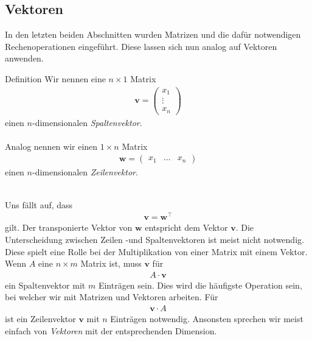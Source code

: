 \subsection{Vektoren}
In den letzten beiden Abschnitten wurden Matrizen und die dafür notwendigen Rechenoperationen eingeführt.
Diese lassen sich nun analog auf Vektoren anwenden.\\
\begin{mybox}{Definition}
Wir nennen eine $n \times 1$ Matrix
\begin{align*}
\textbf{v}
=
\begin{pmatrix}
x_1 \\
\vdots\\
x_n
\end{pmatrix}
\end{align*}
einen $n$-dimensionalen \textit{Spaltenvektor}.\\ \\
Analog nennen wir einen $1 \times n$ Matrix
\begin{align*}
\textbf{w}
=
\begin{pmatrix}
x_1 & \dots & x_n 
\end{pmatrix}
\end{align*}
einen $n$-dimensionalen \textit{Zeilenvektor}.
\end{mybox}\ \\
Uns fällt auf, dass
\begin{align*}
\textbf{v} = \textbf{w}^\top
\end{align*}
gilt.
Der transponierte Vektor von $\textbf{w}$ entspricht dem Vektor $\textbf{v}$.
Die Unterscheidung zwischen Zeilen -und Spaltenvektoren ist meist nicht notwendig.
Diese spielt eine Rolle bei der Multiplikation von einer Matrix mit einem Vektor.\\
Wenn $A$ eine $n \times m$ Matrix ist, muss $\textbf{v}$ für 
\begin{align*}
A \cdot \textbf{v}
\end{align*}
ein Spaltenvektor mit $m$ Einträgen sein.
Dies wird die häufigste Operation sein, bei welcher wir mit Matrizen und Vektoren arbeiten.
Für
\begin{align*}
\textbf{v} \cdot A
\end{align*}
ist ein Zeilenvektor $\textbf{v}$ mit $n$ Einträgen notwendig. 
Ansonsten sprechen wir meist einfach von \textit{Vektoren} mit der entsprechenden Dimension.\\


